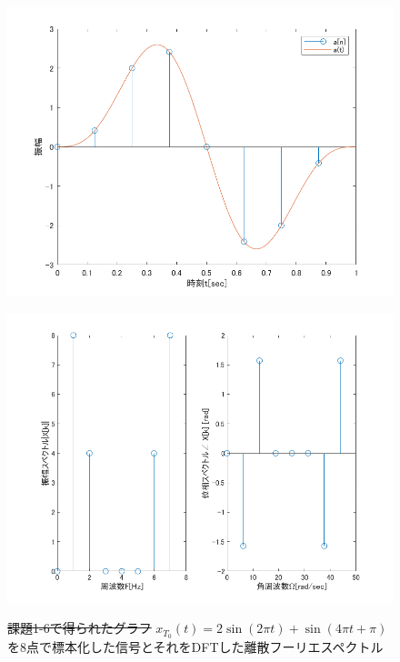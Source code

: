 \documentclass[11pt, a4paper, titlepage]{ltjsarticle}
\begin{document}
\begin{figure}[h]
\begin{center}
\begin{minipage}[t]{0.48\columnwidth}
    \includegraphics[width=\columnwidth]{figures/sampling1-6.png}
    \label{fign:sa1-6}
\end{minipage}
\begin{minipage}[t]{0.48\columnwidth}
    \includegraphics[width=\columnwidth]{figures/spectrum1-6.png}
    \label{fign:sp1-6}
\end{minipage}
\end{center}
\caption{\sout{課題1-6で得られたグラフ}
$x_{T_{0}}(t)=2\sin(2\pi t)+\sin(4\pi t + \pi)$を8点で標本化した信号とそれをDFTした離散フーリエスペクトル}
\end{figure}
\end{document}
